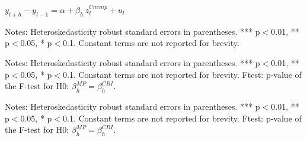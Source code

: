 \documentclass[a4paper,12pt]{article}
\newcommand{\pathTables}{tables/}
\begin{document}
\begin{table}[!htbp]
\begin{center}
\caption{The effect of euro area unemployment rate surprises on financial variables}\label{tab: lp z ea unemp}
$y^{}_{t+h}-y^{}_{t-1} = \alpha + \beta_h\, z^{Unemp}_t + u_t$
\small
{}
\end{center}\footnotesize
Notes: Heteroskedasticity robust standard errors in parentheses. *** p$<$0.01, ** p$<$0.05, * p$<$0.1.
Constant terms are not reported for brevity.
\end{table}


\begin{table}[!htbp]\small
\begin{center}
\caption{The effect of ECB monetary policy and information shocks on stock sub-indices.}\label{tab: lp ecb shocks stocks}
\end{center}
Notes: Heteroskedasticity robust standard errors in parentheses. *** p$<$0.01, ** p$<$0.05, * p$<$0.1.
Constant terms are not reported for brevity.
Ftest: p-value of the F-test for H0: $\beta^{MP}_h=\beta^{CBI}_h$.
\end{table}

\begin{table}[!htbp]\addtocounter{table}{-1}\small
\begin{center}
\caption{Continued}
\end{center}
Notes: Heteroskedasticity robust standard errors in parentheses. *** p$<$0.01, ** p$<$0.05, * p$<$0.1.
Constant terms are not reported for brevity.
Ftest: p-value of the F-test for H0: $\beta^{MP}_h=\beta^{CBI}_h$.
\end{table}
\end{document}
